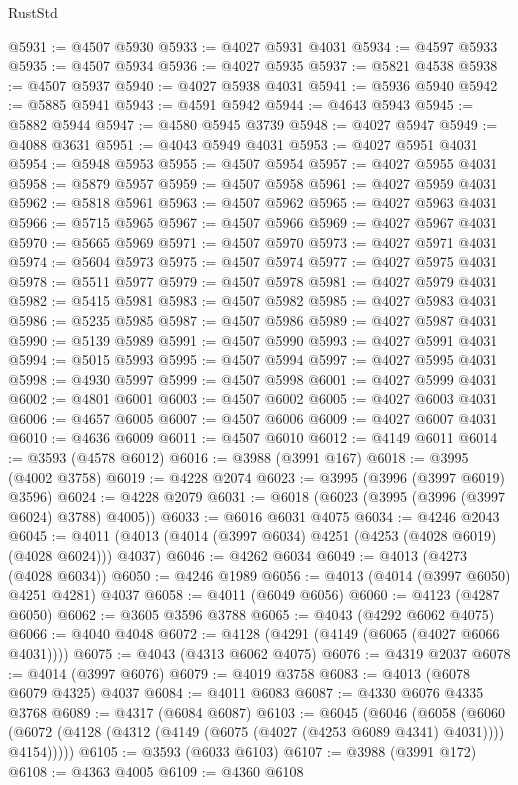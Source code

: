 \begin{lexlean}{RustStd}
\begin{coremodule}
@5931 := @4507 @5930
@5933 := @4027 @5931 @4031
@5934 := @4597 @5933
@5935 := @4507 @5934
@5936 := @4027 @5935
@5937 := @5821 @4538
@5938 := @4507 @5937
@5940 := @4027 @5938 @4031
@5941 := @5936 @5940
@5942 := @5885 @5941
@5943 := @4591 @5942
@5944 := @4643 @5943
@5945 := @5882 @5944
@5947 := @4580 @5945 @3739
@5948 := @4027 @5947
@5949 := @4088 @3631
@5951 := @4043 @5949 @4031
@5953 := @4027 @5951 @4031
@5954 := @5948 @5953
@5955 := @4507 @5954
@5957 := @4027 @5955 @4031
@5958 := @5879 @5957
@5959 := @4507 @5958
@5961 := @4027 @5959 @4031
@5962 := @5818 @5961
@5963 := @4507 @5962
@5965 := @4027 @5963 @4031
@5966 := @5715 @5965
@5967 := @4507 @5966
@5969 := @4027 @5967 @4031
@5970 := @5665 @5969
@5971 := @4507 @5970
@5973 := @4027 @5971 @4031
@5974 := @5604 @5973
@5975 := @4507 @5974
@5977 := @4027 @5975 @4031
@5978 := @5511 @5977
@5979 := @4507 @5978
@5981 := @4027 @5979 @4031
@5982 := @5415 @5981
@5983 := @4507 @5982
@5985 := @4027 @5983 @4031
@5986 := @5235 @5985
@5987 := @4507 @5986
@5989 := @4027 @5987 @4031
@5990 := @5139 @5989
@5991 := @4507 @5990
@5993 := @4027 @5991 @4031
@5994 := @5015 @5993
@5995 := @4507 @5994
@5997 := @4027 @5995 @4031
@5998 := @4930 @5997
@5999 := @4507 @5998
@6001 := @4027 @5999 @4031
@6002 := @4801 @6001
@6003 := @4507 @6002
@6005 := @4027 @6003 @4031
@6006 := @4657 @6005
@6007 := @4507 @6006
@6009 := @4027 @6007 @4031
@6010 := @4636 @6009
@6011 := @4507 @6010
@6012 := @4149 @6011
@6014 := @3593 (@4578 @6012)
@6016 := @3988 (@3991 @167)
@6018 := @3995 (@4002 @3758)
@6019 := @4228 @2074
@6023 := @3995 (@3996 (@3997 @6019) @3596)
@6024 := @4228 @2079
@6031 := @6018 (@6023 (@3995 (@3996 (@3997 @6024) @3788) @4005))
@6033 := @6016 @6031 @4075
@6034 := @4246 @2043
@6045 := @4011 (@4013 (@4014 (@3997 @6034) @4251 (@4253 (@4028 @6019) (@4028 @6024))) @4037)
@6046 := @4262 @6034
@6049 := @4013 (@4273 (@4028 @6034))
@6050 := @4246 @1989
@6056 := @4013 (@4014 (@3997 @6050) @4251 @4281) @4037
@6058 := @4011 (@6049 @6056)
@6060 := @4123 (@4287 @6050)
@6062 := @3605 @3596 @3788
@6065 := @4043 (@4292 @6062 @4075)
@6066 := @4040 @4048
@6072 := @4128 (@4291 (@4149 (@6065 (@4027 @6066 @4031))))
@6075 := @4043 (@4313 @6062 @4075)
@6076 := @4319 @2037
@6078 := @4014 (@3997 @6076)
@6079 := @4019 @3758
@6083 := @4013 (@6078 @6079 @4325) @4037
@6084 := @4011 @6083
@6087 := @4330 @6076 @4335 @3768
@6089 := @4317 (@6084 @6087)
@6103 := @6045
    (@6046
      (@6058
        (@6060 (@6072 (@4128 (@4312 (@4149 (@6075 (@4027 (@4253 @6089 @4341) @4031)))) @4154)))))
@6105 := @3593 (@6033 @6103)
@6107 := @3988 (@3991 @172)
@6108 := @4363 @4005
@6109 := @4360 @6108

\end{coremodule}
\end{lexlean}
